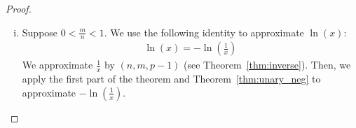 \documentclass{article}
\numberwithin{mytheorem}{section}
\newcommand{\lnsumu}[2] {\frac{#1-1}{#2} \sum_{i=0}^{#2-1}\frac{1}{1+\frac{i}{#2}(#1-1)}}
\begin{document}
\begin{proof}
\begin{enumerate}[i.]
From Theorem~\ref{thm:add}.\ref{thm:add_diff_sign} we conclude that $j$ units of precision is lost by subtracting $1$ from $x$ where $j\geq \log_2(\frac{1+\frac{n}{m}}{1-\frac{n}{m}})$. We obtain the following inequalities:
\begin{gather*}
|(x-1)-(\frac{m}{n}-1)|<\frac{1}{2^{p-j}}|\frac{m}{n}-1|\\
|\frac{i}{N}(x-1)-\frac{i}{N}(\frac{m}{n}-1)|<\frac{1}{2^{p-j}}|\frac{i}{N}(\frac{m}{n}-1)|
\end{gather*}
The approximation $\frac{i}{N}(\frac{m}{n}-1)$ of $\frac{i}{N}(x-1)$ is positive. Hence, we do not lose precision by adding $\frac{i}{N}(x-1)$ and $1$ (see Theorem~\ref{thm:add}.\ref{thm:add_same_sign}).
\begin{align*}
|(1+\frac{i}{N}(x-1))-(1+\frac{i}{N}(\frac{m}{n}-1))|<\frac{1}{2^{p-j}}|1+\frac{i}{N}(\frac{m}{n}-1)|
\end{align*}
By approximating the inverse of $1+\frac{i}{N}(x-1)$, we lose $1$ unit of precision (see Theorem~\ref{thm:inverse}):
\begin{align*}
|\frac{1}{1+\frac{i}{N}(x-1)}-\frac{1}{1+\frac{i}{N}(\frac{m}{n}-1)}|<\frac{1}{2^{p-j-1}}|\frac{1}{1+\frac{i}{N}(\frac{m}{n}-1)}|
\end{align*}
We lose $2$ units of precision by multiplying $\frac{x-1}{N}$ and $\frac{1}{1+\frac{i}{N}(x-1)}$ (see Theorem~\ref{thm:mult}):
\begin{align*}
|\frac{x-1}{N}.\frac{1}{1+\frac{i}{N}(x-1)}-\frac{(\frac{m}{n}-1)}{N}.&\frac{1}{1+\frac{i}{N}(\frac{m}{n}-1)}|\\
&<\frac{1}{2^{p-j-3}}|\frac{(\frac{m}{n}-1)}{N}.\frac{1}{1+\frac{i}{N}(\frac{m}{n}-1)}|
\end{align*}
Since the numbers $\frac{x-1}{N}.\frac{1}{1+\frac{i}{N}(x-1)}$ are approximated by the positive numbers $\frac{\frac{m}{n}-1}{N}.\frac{1}{1+\frac{i}{N}(\frac{m}{n}-1)}$, calculating the summation $\lnsumu{x}{N}$ does not affect the precision:
\begin{align*}
|\lnsumu{x}{N}-&\lnsumu{\frac{m}{n}}{N}|\\
&<\frac{1}{2^{p-j-3}}|\lnsumu{\frac{m}{n}}{N}|
\end{align*}
\item
Suppose $0<\frac{m}{n}<1$. We use the following identity to approximate $\ln(x)$:
\begin{align*}
\ln(x)=-\ln(\frac{1}{x})
\end{align*}
We approximate $\frac{1}{x}$ by $(n,m,p-1)$ (see Theorem~\ref{thm:inverse}). Then, we apply the first part of the theorem and Theorem~\ref{thm:unary_neg} to approximate $-\ln(\frac{1}{x})$.
\end{enumerate}
\end{proof}
\end{document}
